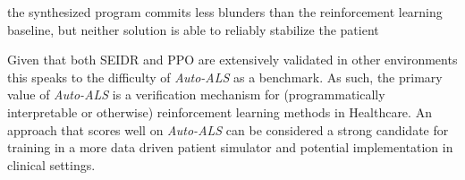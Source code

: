 \begin{highlight}
the synthesized program commits less blunders than the reinforcement learning baseline, but neither solution is able to reliably stabilize the patient
\end{highlight}

Given that both SEIDR and PPO are extensively validated in other environments this speaks to the difficulty of \emph{Auto-ALS} as a benchmark.
As such, the primary value of \emph{Auto-ALS} is a verification mechanism for (programmatically interpretable or otherwise) reinforcement learning methods in Healthcare.
An approach that scores well on \emph{Auto-ALS} can be considered a strong candidate for training in a more data driven patient simulator and potential implementation in clinical settings.